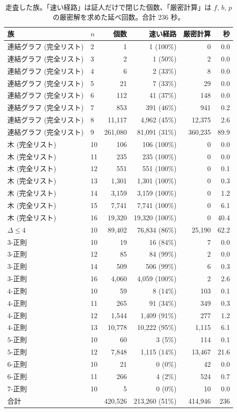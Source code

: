 \documentclass[paper=a4,fontsize=10.5pt,jafontsize=10.5pt]{jlreq}
\theoremstyle{plain}
\theoremstyle{definition}
\begin{document}
\begin{table}[htbp]
\centering
\caption{走査した族。「速い経路」は証人だけで閉じた個数、「厳密計算」は
$f$, $b$, $p$ の厳密解を求めた延べ回数。合計 236 秒。}
\label{tab:fams}
\begin{tabular}{llrrrr}
\toprule
族 & $n$ & 個数 & 速い経路 & 厳密計算 & 秒 \\
\midrule
連結グラフ (完全リスト) & 2 & 1 & 1 (100\%) & 0 & 0.0 \\
連結グラフ (完全リスト) & 3 & 2 & 1 (50\%) & 2 & 0.0 \\
連結グラフ (完全リスト) & 4 & 6 & 2 (33\%) & 8 & 0.0 \\
連結グラフ (完全リスト) & 5 & 21 & 7 (33\%) & 29 & 0.0 \\
連結グラフ (完全リスト) & 6 & 112 & 41 (37\%) & 148 & 0.0 \\
連結グラフ (完全リスト) & 7 & 853 & 391 (46\%) & 941 & 0.2 \\
連結グラフ (完全リスト) & 8 & 11,117 & 4,962 (45\%) & 12,375 & 2.6 \\
連結グラフ (完全リスト) & 9 & 261,080 & 81,091 (31\%) & 360,235 & 89.9 \\
木 (完全リスト) & 10 & 106 & 106 (100\%) & 0 & 0.0 \\
木 (完全リスト) & 11 & 235 & 235 (100\%) & 0 & 0.0 \\
木 (完全リスト) & 12 & 551 & 551 (100\%) & 0 & 0.1 \\
木 (完全リスト) & 13 & 1,301 & 1,301 (100\%) & 0 & 0.3 \\
木 (完全リスト) & 14 & 3,159 & 3,159 (100\%) & 0 & 1.2 \\
木 (完全リスト) & 15 & 7,741 & 7,741 (100\%) & 0 & 6.1 \\
木 (完全リスト) & 16 & 19,320 & 19,320 (100\%) & 0 & 40.4 \\
$\Delta \le 4$ & 10 & 89,402 & 76,834 (86\%) & 25,190 & 62.2 \\
$3$-正則 & 10 & 19 & 16 (84\%) & 7 & 0.0 \\
$3$-正則 & 12 & 85 & 84 (99\%) & 2 & 0.0 \\
$3$-正則 & 14 & 509 & 506 (99\%) & 6 & 0.3 \\
$3$-正則 & 16 & 4,060 & 4,059 (100\%) & 2 & 2.6 \\
$4$-正則 & 10 & 59 & 8 (14\%) & 103 & 0.1 \\
$4$-正則 & 11 & 265 & 91 (34\%) & 349 & 0.3 \\
$4$-正則 & 12 & 1,544 & 1,409 (91\%) & 277 & 1.2 \\
$4$-正則 & 13 & 10,778 & 10,222 (95\%) & 1,115 & 6.1 \\
$5$-正則 & 10 & 60 & 3 (5\%) & 114 & 0.1 \\
$5$-正則 & 12 & 7,848 & 1,115 (14\%) & 13,467 & 21.6 \\
$6$-正則 & 10 & 21 & 0 (0\%) & 42 & 0.0 \\
$6$-正則 & 11 & 266 & 4 (2\%) & 524 & 0.7 \\
$7$-正則 & 10 & 5 & 0 (0\%) & 10 & 0.0 \\
\midrule
合計 & & 420,526 & 213,260 (51\%) & 414,946 & 236 \\
\bottomrule
\end{tabular}
\end{table}
\end{document}
